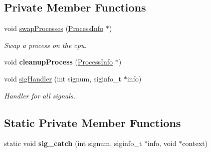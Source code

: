 \subsection*{\-Private \-Member \-Functions}
\begin{DoxyCompactItemize}
\item 
void \hyperlink{classcKernel_a1a0cb2a56afb1e4adfd3bb05156aec81}{swap\-Processes} (\hyperlink{structProcessInfo}{\-Process\-Info} $\ast$)
\begin{DoxyCompactList}\small\item\em \-Swap a process on the cpu. \end{DoxyCompactList}\item 
\hypertarget{classcKernel_abcc0464e62a5fb82ddf4a3f8ba5ec461}{void {\bfseries cleanup\-Process} (\hyperlink{structProcessInfo}{\-Process\-Info} $\ast$)}\label{db/da5/classcKernel_abcc0464e62a5fb82ddf4a3f8ba5ec461}

\item 
void \hyperlink{classcKernel_a60ccaffeee3cfcfdfb4aa7b9e33b19f4}{sig\-Handler} (int signum, siginfo\-\_\-t $\ast$info)
\begin{DoxyCompactList}\small\item\em \-Handler for all signals. \end{DoxyCompactList}\end{DoxyCompactItemize}
\subsection*{\-Static \-Private \-Member \-Functions}
\begin{DoxyCompactItemize}
\item 
\hypertarget{classcKernel_a571bb344ba50970d9c4a1cb5b500bbcd}{static void {\bfseries sig\-\_\-catch} (int signum, siginfo\-\_\-t $\ast$info, void $\ast$context)}\label{db/da5/classcKernel_a571bb344ba50970d9c4a1cb5b500bbcd}

\end{DoxyCompactItemize}

